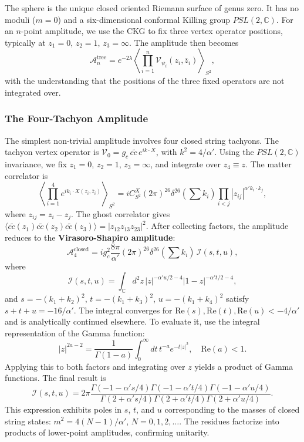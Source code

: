 \documentclass[11pt]{article}
\renewcommand{\tilde}{\widetilde}
\renewcommand{\bar}{\overline}
\begin{document}
The sphere is the unique closed oriented Riemann surface of genus zero. It has no moduli ($m=0$) and a six-dimensional conformal Killing group $PSL(2,\mathbb{C})$. For an $n$-point amplitude, we use the CKG to fix three vertex operator positions, typically at $z_1=0$, $z_2=1$, $z_3=\infty$. The amplitude then becomes
\begin{equation}
\mathcal{A}_n^{\text{tree}} = e^{-2\lambda} \left\langle \prod_{i=1}^n \mathcal{V}_{\psi_i}(z_i,\bar{z}_i) \right\rangle_{S^2},
\end{equation}
with the understanding that the positions of the three fixed operators are not integrated over.

\subsubsection{The Four-Tachyon Amplitude}

The simplest non-trivial amplitude involves four closed string tachyons. The tachyon vertex operator is $\mathcal{V}_0 = g_c \, c\tilde{c} \, e^{ik\cdot X}$, with $k^2 = 4/\alpha'$. Using the $PSL(2,\mathbb{C})$ invariance, we fix $z_1=0$, $z_2=1$, $z_3=\infty$, and integrate over $z_4 \equiv z$. The matter correlator is
\begin{equation}
\left\langle \prod_{i=1}^4 e^{ik_i\cdot X(z_i,\bar{z}_i)} \right\rangle_{S^2} = i C_{S^2}^X (2\pi)^{26} \delta^{26}(\sum k_i) \prod_{i<j} |z_{ij}|^{\alpha' k_i\cdot k_j},
\end{equation}
where $z_{ij}=z_i-z_j$. The ghost correlator gives $\langle c\tilde{c}(z_1) c\tilde{c}(z_2) c\tilde{c}(z_3) \rangle = |z_{12}z_{13}z_{23}|^2$. After collecting factors, the amplitude reduces to the \textbf{Virasoro-Shapiro amplitude}:
\begin{equation}
\mathcal{A}_4^{\text{closed}} = i g_c^2 \frac{8\pi}{\alpha'} (2\pi)^{26} \delta^{26}(\sum k_i) \, \mathcal{I}(s,t,u),
\end{equation}
where
\begin{equation}
\mathcal{I}(s,t,u) = \int_{\mathbb{C}} d^2z \, |z|^{-\alpha' u/2 -4} |1-z|^{-\alpha' t/2 -4},
\end{equation}
and $s = -(k_1+k_2)^2$, $t = -(k_1+k_3)^2$, $u = -(k_1+k_4)^2$ satisfy $s+t+u = -16/\alpha'$. The integral converges for $\mathrm{Re}(s), \mathrm{Re}(t), \mathrm{Re}(u) < -4/\alpha'$ and is analytically continued elsewhere. To evaluate it, use the integral representation of the Gamma function:
\begin{equation}
|z|^{2a-2} = \frac{1}{\Gamma(1-a)} \int_0^\infty dt \, t^{-a} e^{-t|z|^2}, \quad \text{Re}(a)<1.
\end{equation}
Applying this to both factors and integrating over $z$ yields a product of Gamma functions. The final result is
\begin{equation}
\mathcal{I}(s,t,u) = 2\pi \frac{\Gamma(-1-\alpha' s/4)\Gamma(-1-\alpha' t/4)\Gamma(-1-\alpha' u/4)}{\Gamma(2+\alpha' s/4)\Gamma(2+\alpha' t/4)\Gamma(2+\alpha' u/4)}.
\end{equation}
This expression exhibits poles in $s$, $t$, and $u$ corresponding to the masses of closed string states: $m^2 = 4(N-1)/\alpha'$, $N=0,1,2,\dots$. The residues factorize into products of lower-point amplitudes, confirming unitarity.
\end{document}
